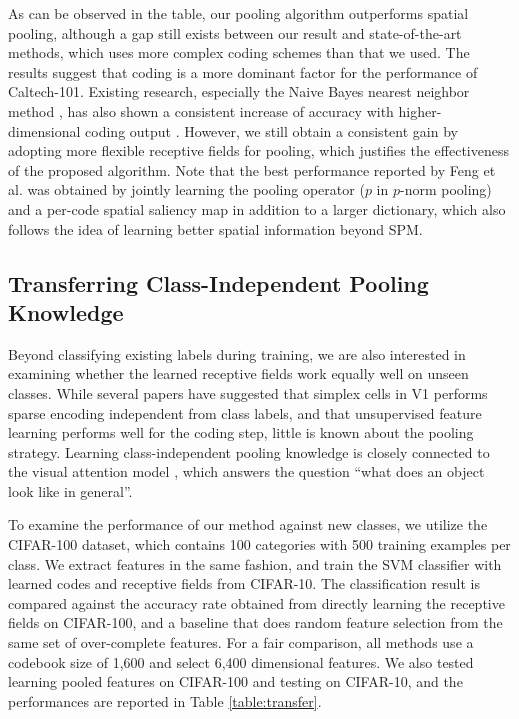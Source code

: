 As can be observed in the table, our pooling algorithm outperforms spatial pooling, although a gap still exists between our result and state-of-the-art methods, which uses more complex coding schemes than that we used. The results suggest that coding is a more dominant factor for the performance of Caltech-101. Existing research, especially the Naive Bayes nearest neighbor method \cite{boiman2008defense}, has also shown a consistent increase of accuracy with higher-dimensional coding output \cite{Boureau:2011tz,yang2010efficient}.
However, we still obtain a consistent gain by adopting more flexible receptive fields for pooling, which justifies the effectiveness of the proposed algorithm. Note that the best performance reported by Feng et al. \cite{Feng:2011wv} was obtained by jointly learning the pooling operator ($p$ in $p$-norm pooling) and a per-code spatial saliency map in addition to a larger dictionary, which also follows the idea of learning better spatial information beyond SPM.


\subsection{Transferring Class-Independent Pooling Knowledge}
Beyond classifying existing labels during training, we are also interested in examining whether the learned receptive fields work equally well on unseen classes. While several papers have suggested that simplex cells in V1 performs sparse encoding independent from class labels, and that unsupervised feature learning performs well for the coding step, little is known about the pooling strategy. Learning class-independent pooling knowledge is closely connected to the visual attention model \cite{Itti:2001wa}, which answers the question ``what does an object look like in general''.

To examine the performance of our method against new classes, we utilize the CIFAR-100 dataset, which contains 100 categories with 500 training examples per class. We extract features in the same fashion, and train the SVM classifier with learned codes and receptive fields from CIFAR-10. The classification result is compared against the accuracy rate obtained from directly learning the receptive fields on CIFAR-100, and a baseline that does random feature selection from the same set of over-complete features. For a fair comparison, all methods use a codebook size of 1,600 and select 6,400 dimensional features. We also tested learning pooled features on CIFAR-100 and testing on CIFAR-10, and the performances are reported in Table \ref{table:transfer}.

